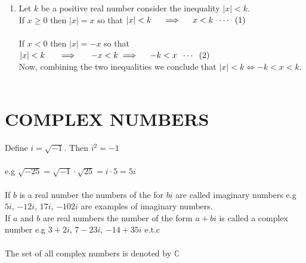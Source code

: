\documentclass[11pt,a4paper]{article}
\begin{document}
\begin{enumerate}
\item[$\bullet$] Let $k$ be a positive real number consider the inequality $|x|<k$.\\
If $x\geq 0$ then $|x|=x$ so that $|x|<k\hspace{0.4cm} \implies \hspace{0.4cm} x<k\hspace{0.2cm} \cdots\hspace{0.2cm}(1)$\\ \\ 
If $x<0$ then $|x|=-x$ so that $|x|<k\hspace{0.5cm} \implies \hspace{0.5cm} -x<k\hspace{0.4cm}\\ \implies \hspace{0.4cm} -k<x\hspace{0.2cm} \cdots \hspace{0.2cm} (2)$\\
Now, combining the two inequalities we conclude that $|x|<k \iff -k<x<k$.\\\\
\end{enumerate}















\pagebreak
\section{COMPLEX NUMBERS}
Define $i=\sqrt{-1}$. Then $i^2=-1$\\\\
e.g $\sqrt{-25}=\sqrt{-1}\cdot \sqrt{25}=i\cdot 5=5i$\\\\
If $b$ is a real number the numbers of the for $bi$ are called imaginary numbers e.g $5i$, $-12i$, $17i$, $-102i$ are examples of imaginary numbers.\\
If $a$ and $b$ are real numbers the number of the form $a+bi$ is called a complex number e.g $3+2i$, $7-23i$, $-14+35i$ e.t.c\\\\
The set of all complex numbers is denoted by $\mathbb{C}$\\
\end{document}
